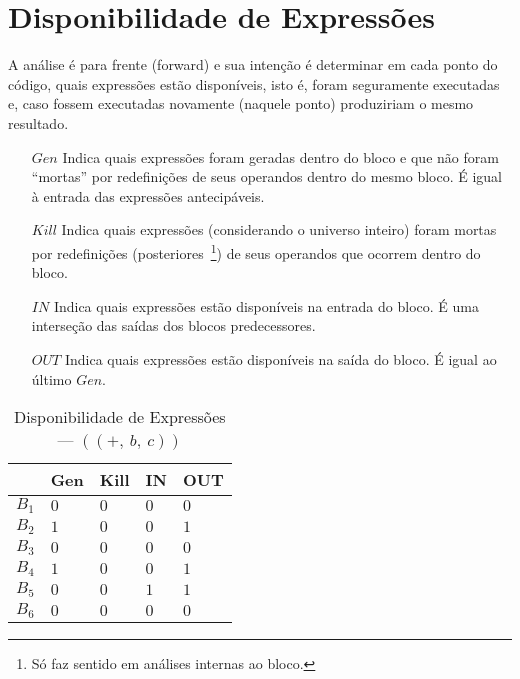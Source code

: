 \section{Disponibilidade de Express\~oes}

A an\'alise \'e para frente (\textsf{forward}) e sua inten\c{c}\~ao \'e determinar em cada ponto do c\'odigo, quais express\~oes est\~ao dispon\'iveis, isto \'e, foram seguramente executadas e, caso fossem executadas novamente (naquele ponto) produziriam o mesmo resultado.
\begin{itemize}
  \item[$Gen$] Indica quais express\~oes foram geradas dentro do bloco e que n\~ao foram ``mortas'' por redefini\c{c}\~oes de seus operandos dentro do mesmo bloco. {\color{red} \'E igual \`a entrada das express\~oes antecip\'aveis}.
  \item[$Kill$] Indica quais express\~oes (considerando o universo inteiro) foram mortas por redefini\c{c}\~oes (posteriores~\footnote{S\'o faz sentido em an\'alises internas ao bloco.}) de seus operandos que ocorrem dentro do bloco.
  \item[$IN$] Indica quais express\~oes est\~ao dispon\'iveis na entrada do bloco. \'E uma interse\c{c}\~ao das sa\'idas dos blocos predecessores.
  \item[$OUT$] Indica quais express\~oes est\~ao dispon\'iveis na sa\'ida do bloco. {\color{red} \'E igual ao \'ultimo $Gen$}.
\end{itemize}



\begin{table}[ht]
\centering
\begin{tabular}{l|l|l|l|l}
	& Gen & Kill & IN & OUT\\
\hline
$B_{1}$ &  $0$ & $0$ & $0$ & $0$\\
$B_{2}$ &  $1$ & $0$ & $0$ & $1$\\
$B_{3}$ &  $0$ & $0$ & $0$ & $0$\\
$B_{4}$ &  $1$ & $0$ & $0$ & $1$\\
$B_{5}$ &  $0$ & $0$ & $1$ & $1$\\
$B_{6}$ &  $0$ & $0$ & $0$ & $0$\\
\end{tabular}
\caption{Disponibilidade de Express\~oes --- $((+,\:b,\:c))$}
\end{table}

